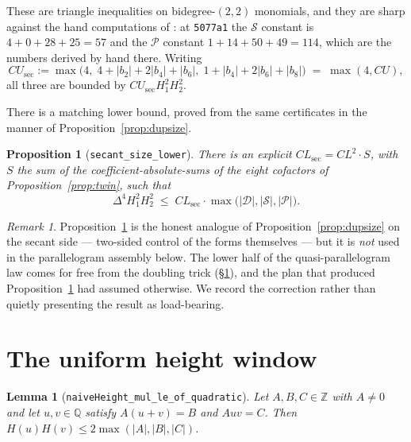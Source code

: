 \documentclass[11pt,reqno]{amsart}
\theoremstyle{plain}
\newtheorem{lemma}[theorem]{Lemma}
\newtheorem{proposition}[theorem]{Proposition}
\theoremstyle{definition}
\theoremstyle{remark}
\newtheorem{remark}[theorem]{Remark}
\DeclareRobustCommand{\lt}[1]{\texttt{#1}}
\newcommand{\nh}{H}
\newcommand{\DDz}{\mathcal{D}}
\newcommand{\Sfz}{\mathcal{S}}
\newcommand{\Prz}{\mathcal{P}}
\begin{document}
These are triangle inequalities on bidegree-$(2,2)$ monomials, and they
are sharp against the hand computations of \cite{MW}: at
\texttt{5077a1} the $\Sfz$ constant is $4+0+28+25 = 57$ and the $\Prz$
constant $1+14+50+49 = 114$, which are the numbers derived by hand
there. Writing
\begin{equation}\label{eq:CUsec}
  CU_{\mathrm{sec}} := \max\bigl(4,\;
    4 + \lvert b_2\rvert + 2\lvert b_4\rvert + \lvert b_6\rvert,\;
    1 + \lvert b_4\rvert + 2\lvert b_6\rvert + \lvert b_8\rvert\bigr)
   \;=\; \max(4, CU),
\end{equation}
all three are bounded by $CU_{\mathrm{sec}}H_1^2H_2^2$.

There is a matching lower bound, proved from the same certificates in
the manner of Proposition~\ref{prop:dupsize}.

\begin{proposition}[\lt{secant\_size\_lower}]\label{prop:seclower}
There is an explicit $CL_{\mathrm{sec}} = CL^2\cdot S$, with $S$ the sum
of the coefficient-absolute-sums of the eight cofactors of
Proposition~\ref{prop:twin}, such that
\[
  \Delta^4 H_1^2H_2^2 \;\le\; CL_{\mathrm{sec}}\cdot
    \max\bigl(\lvert\DDz\rvert, \lvert\Sfz\rvert,
              \lvert\Prz\rvert\bigr).
\]
\end{proposition}

\begin{remark}
Proposition~\ref{prop:seclower} is the honest analogue of
Proposition~\ref{prop:dupsize} on the secant side --- two-sided control
of the forms themselves --- but it is \emph{not} used in the
parallelogram assembly below. The lower half of the
quasi-parallelogram law comes for free from the doubling trick
(\S\ref{sec:window}), and the plan that produced
Proposition~\ref{prop:seclower} had assumed otherwise. We record the
correction rather than quietly presenting the result as load-bearing.
\end{remark}

\section{The uniform height window}\label{sec:window}

\begin{lemma}[\lt{naiveHeight\_mul\_le\_of\_quadratic}]\label{lem:roots}
Let $A,B,C \in \mathbb{Z}$ with $A \ne 0$ and let $u,v \in \mathbb{Q}$
satisfy $A(u+v) = B$ and $Auv = C$. Then
$\nh(u)\nh(v) \le 2\max(\lvert A\rvert,\lvert B\rvert,\lvert C\rvert)$.
\end{lemma}
\end{document}
